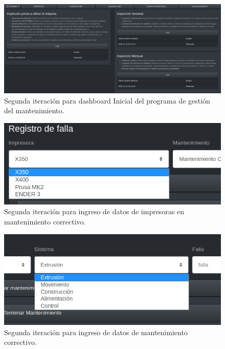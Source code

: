 \begin{figure}[H]
\centering
\includegraphics[scale=0.4,angle=90]{images/v02_insprevia.png}
\caption{Segunda iteración para dashboard Inicial del programa de gestión del mantenimiento.}
\label{v02_insprevia}
\end{figure}

\begin{figure}[H]
\centering
\includegraphics[scale=0.9]{images/menuimpresora.png}
\caption{Segunda iteración para ingreso de datos de impresoras en mantenimiento correctivo.}
\label{menuimpresora}
\end{figure}

\begin{figure}[H]
\centering
\includegraphics[scale=0.9]{images/pestanasistema.png}
\caption{Segunda iteración para ingreso de datos de mantenimiento correctivo.}
\label{pestanasistema}
\end{figure}







  

